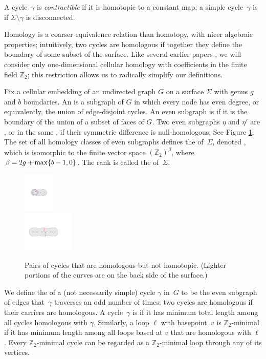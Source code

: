 \documentclass[twoside,leqno,twocolumn]{article}
\def\Z{\mathbb{Z}}
\let\cycle\gamma
\begin{document}
A cycle~$\gamma$ is \emph{contractible} if it is homotopic to a constant map; a simple cycle~$\gamma$ is  if $\Sigma\setminus\gamma$ is disconnected.

Homology is a coarser equivalence relation than homotopy, with nicer algebraic properties; intuitively, two cycles are homologous if together they define the boundary of some subset of the surface.  Like several earlier papers \cite{cf-qhc2-07, cf-qhc-08, dls-chtl-07, dlsc-cgaht-08, surfcut}, we will consider only one-dimensional cellular homology with coefficients in the finite field $\Z_2$; this restriction allows us to radically simplify our definitions.  

Fix a cellular embedding of an undirected graph $G$ on a surface $\Sigma$ with genus $g$ and $b$ boundaries.  An  is a subgraph of $G$ in which every node has even degree, or equivalently, the union of edge-disjoint cycles.  An even subgraph is  if it is the boundary of the union of a subset of faces of $G$.  Two even subgraphs $\eta$ and $\eta'$ are , or in the same , if their symmetric difference  is null-homologous; See Figure \ref{F:homology}.  The set of all homology classes of even subgraphs defines the  of~$\Sigma$, denoted \EMPH{$H_1(\Sigma; \Z_2)$}, which is isomorphic to the finite vector space $(\Z_2)^\beta$, where $\beta = 2g + \max\{ {b-1}, 0 \}$.  The rank \EMPH{$\beta$} is called the  of~$\Sigma$.

\begin{figure}
\centering
\includegraphics[height=0.75in]{Fig/homologous3}\\[2ex]
\includegraphics[height=0.75in]{Fig/homologous2}
\caption{Pairs of cycles that are homologous but not homotopic.  (Lighter portions of the curves are on the back side of the surface.)}
\label{F:homology}
\end{figure}

We define the  of a (not necessarily simple) cycle $\cycle$ in~$G$ to be the even subgraph of edges that~$\cycle$ traverses an odd number of times; two cycles are homologous if their carriers are homologous.  A cycle~$\cycle$ is \EMPH{$\Z_2$-minimal} if it has minimum total length among all cycles homologous with $\cycle$.  Similarly, a loop $\ell$ with basepoint~$v$ is $\Z_2$-minimal if it has minimum length among all loops based at $v$ that are homologous with $\ell$.  Every $\Z_2$-minimal cycle can be regarded as a $\Z_2$-minimal loop through any of its vertices.
\end{document}
